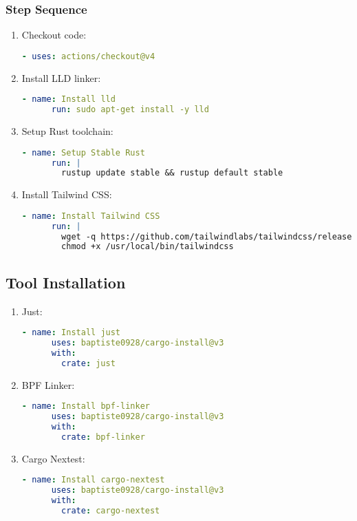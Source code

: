 \documentclass{article}
\begin{document}
\subsubsection{Step Sequence}
\begin{enumerate}[label=\arabic*.]
    \item Checkout code:
    \begin{lstlisting}[language=yaml]
    - uses: actions/checkout@v4
    \end{lstlisting}

    \item Install LLD linker:
    \begin{lstlisting}[language=yaml]
    - name: Install lld
      run: sudo apt-get install -y lld
    \end{lstlisting}

    \item Setup Rust toolchain:
    \begin{lstlisting}[language=yaml]
    - name: Setup Stable Rust
      run: |
        rustup update stable && rustup default stable
    \end{lstlisting}

    \item Install Tailwind CSS:
    \begin{lstlisting}[language=yaml]
    - name: Install Tailwind CSS
      run: |
        wget -q https://github.com/tailwindlabs/tailwindcss/releases/download/v3.4.15/tailwindcss-linux-x64 -O /usr/local/bin/tailwindcss
        chmod +x /usr/local/bin/tailwindcss
    \end{lstlisting}
\end{enumerate}

\subsection{Tool Installation}
\begin{enumerate}[label=\arabic*.]
    \item Just:
    \begin{lstlisting}[language=yaml]
    - name: Install just
      uses: baptiste0928/cargo-install@v3
      with:
        crate: just
    \end{lstlisting}

    \item BPF Linker:
    \begin{lstlisting}[language=yaml]
    - name: Install bpf-linker
      uses: baptiste0928/cargo-install@v3
      with:
        crate: bpf-linker
    \end{lstlisting}

    \item Cargo Nextest:
    \begin{lstlisting}[language=yaml]
    - name: Install cargo-nextest
      uses: baptiste0928/cargo-install@v3
      with:
        crate: cargo-nextest
    \end{lstlisting}
\end{enumerate}
\end{document}
